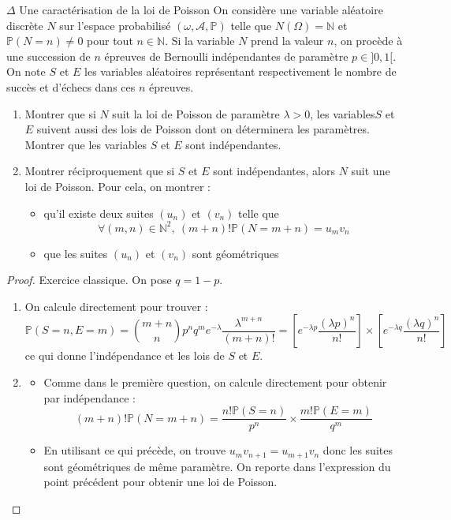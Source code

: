 \documentclass[french,a4paper]{article}
\renewcommand{\P}{\mathbb{P}}
\newcommand{\N}{\mathbb{N}}
\theoremstyle{plain}
\theoremstyle{definition}
\theoremstyle{remark}
\begin{document}
\begin{ex}[Moulin.49]{$\Delta$ Une caractérisation de la loi de Poisson}
	On considère une variable aléatoire discrète $N$ sur l'espace probabilisé $(\omega,\mathcal{A},\P)$ telle que $N(\Omega)=\N$ et $\P(N=n)\ne0$ pour tout $n\in\N$. Si la variable $N$ prend la valeur $n$, on procède à une succession de $n$ épreuves de Bernoulli indépendantes de paramètre $p\in]0,1[$. On note $S$ et $E$ les variables aléatoires représentant respectivement le nombre de succès et d'échecs dans ces $n$ épreuves.
	\begin{enumerate}
		\item Montrer que si $N$ suit la loi de Poisson de paramètre $\lambda>0$, les variables$S$ et $E$ suivent aussi des lois de Poisson dont on déterminera les paramètres. Montrer que les variables $S$ et $E$ sont indépendantes.
		\item Montrer réciproquement que si $S$ et $E$ sont indépendantes, alors $N$ suit une loi de Poisson. Pour cela, on montrer :
		\begin{itemize}
			\item qu'il existe deux suites $(u_n)$ et $(v_n)$ telle que $$\forall (m,n)\in\N^2,\ (m+n)!\P(N=m+n)=u_mv_n$$
			\item que les suites $(u_n)$ et $(v_n)$ sont géométriques
		\end{itemize}
	\end{enumerate}
\end{ex}
\begin{proof}
	Exercice classique. On pose $q=1-p$.
	\begin{enumerate}
		\item On calcule directement pour trouver : $$\P(S=n,E=m)=\binom{m+n}{n}p^nq^me^{-\lambda}\frac{\lambda^{m+n}}{(m+n)!}=\left[e^{-\lambda p}\frac{(\lambda p)^n}{n!}\right]\times \left[e^{-\lambda q}\frac{(\lambda q)^n}{n!}\right]$$ ce qui donne l'indépendance et les lois de $S$ et $E$.
		\item \begin{itemize}
			\item Comme dans le première question, on calcule directement pour obtenir par indépendance : $$(m+n)!\P(N=m+n)=\frac{n!\P(S=n)}{p^n}\times\frac{m!\P(E=m)}{q^m}$$
			\item En utilisant ce qui précède, on trouve $u_{m}v_{n+1}=u_{m+1}v_n$ donc les suites sont géométriques de même paramètre. On reporte dans l'expression du point précédent pour obtenir une loi de Poisson.
		\end{itemize}
	\end{enumerate}
\end{proof}
\end{document}
